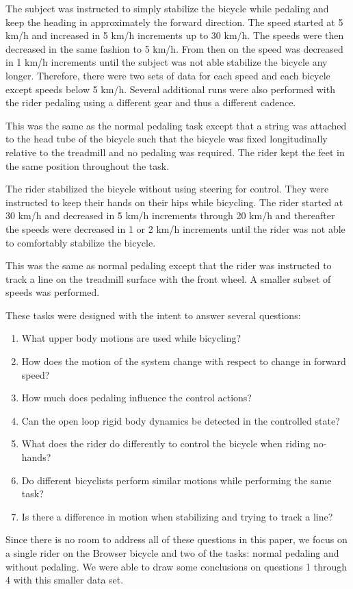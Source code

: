 \begin{description}
 \item[Normal pedaling] The subject was instructed to simply stabilize the
     bicycle while pedaling and keep the heading in approximately the forward
     direction. The speed started at 5 km/h and increased in 5 km/h increments
     up to 30 km/h. The speeds were then decreased in the same fashion to 5
     km/h. From then on the speed was decreased in 1 km/h increments until the
     subject was not able stabilize the bicycle any longer. Therefore, there
     were two sets of data for each speed and each bicycle except speeds below
     5 km/h. Several additional runs were also performed with the rider
     pedaling using a different gear and thus a different cadence.
 \item[Without pedaling] This was the same as the normal pedaling task except
     that a string was attached to the head tube of the bicycle such that the
     bicycle was fixed longitudinally relative to the treadmill and no pedaling
     was required. The rider kept the feet in the same position throughout the
     task.
 \item[No-hands] The rider stabilized the bicycle without using steering for
     control. They were instructed to keep their hands on their hips while
     bicycling. The rider started at 30 km/h and decreased in 5 km/h increments
     through 20 km/h and thereafter the speeds were decreased in 1 or 2 km/h
     increments until the rider was not able to comfortably stabilize the
     bicycle.
 \item[Line tracking] This was the same as normal pedaling except that the
     rider was instructed to track a line on the treadmill surface with the
     front wheel. A smaller subset of speeds was performed.
\end{description}
These tasks were designed with the intent to answer several questions:
\begin{enumerate}
    \item What upper body motions are used while bicycling?
    \item How does the motion of the system change with respect to change in forward speed?
    \item How much does pedaling influence the control actions?
    \item Can the open loop rigid body dynamics be detected in the controlled state?
    \item What does the rider do differently to control the bicycle when riding no-hands?
    \item Do different bicyclists perform similar motions while performing the same task?
    \item Is there a difference in motion when stabilizing and trying to track a line?
\end{enumerate}
Since there is no room to address all of these questions in this paper, we
focus on a single rider on the Browser bicycle and two of the tasks: normal
pedaling and without pedaling. We were able to draw some conclusions on
questions 1 through 4 with this smaller data set.

